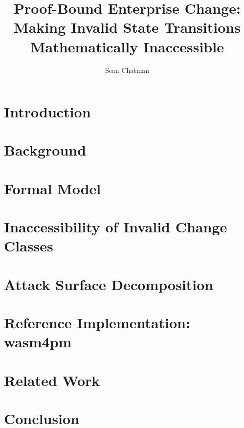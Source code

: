 \documentclass[runningheads]{llncs}
\begin{document}
\title{Proof-Bound Enterprise Change:\\
Making Invalid State Transitions Mathematically Inaccessible}


\author{Sean Chatman}

\maketitle



\section{Introduction}
\label{sec:intro}


\section{Background}
\label{sec:background}


\section{Formal Model}
\label{sec:model}


\section{Inaccessibility of Invalid Change Classes}
\label{sec:inaccessibility}


\section{Attack Surface Decomposition}
\label{sec:attacks}


\section{Reference Implementation: wasm4pm}
\label{sec:impl}


\section{Related Work}
\label{sec:related}


\section{Conclusion}
\label{sec:conclusion}




\end{document}
